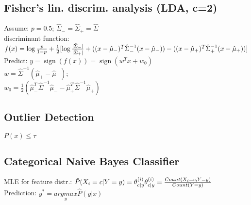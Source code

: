 \subsection*{Fisher's lin. discrim. analysis (LDA, c=2)}
Assume: $p = 0.5$; $\hat{\Sigma}_- = \hat{\Sigma}_+ = \hat{\Sigma}$\\
discriminant function: 
$f(x) = \operatorname{log} \frac{p}{1-p} + \\
\frac{1}{2}[\operatorname{log} \frac{|\hat{\Sigma}_-|}{|\hat{\Sigma}_+|}
+ ((x - \hat{\mu}_-)^T \hat{\Sigma}_-^{-1} (x - \hat{\mu}_-)) - \\
((x - \hat{\mu}_+)^T \hat{\Sigma}_+^{-1} (x - \hat{\mu}_+))]$\\
Predict: $y = \operatorname{sign}(f(x)) = \operatorname{sign} (w^T x + w_0)$\\
$w = \hat{\Sigma}^{-1}(\hat{\mu}_+ - \hat{\mu}_-)$; \\
$w_0 = \frac{1}{2}(\hat{\mu}_-^T\hat{\Sigma}^{-1}\hat{\mu}_- - \hat{\mu}_+^T \hat{\Sigma}^{-1}\hat{\mu}_+)$

\subsection*{Outlier Detection}
$P(x) \leq \tau$

\subsection*{Categorical Naive Bayes Classifier}
MLE for feature distr.:
$\hat{P}(X_i = c|Y = y) = \theta_{c|y}^{(i)}\\
\theta_{c|y}^{(i)} = \frac{Count(X_i = c, Y = y)}{Count(Y=y)}$\\
Prediction: $y^* = \underset{y}{argmax}\hat{P}(y|x)$